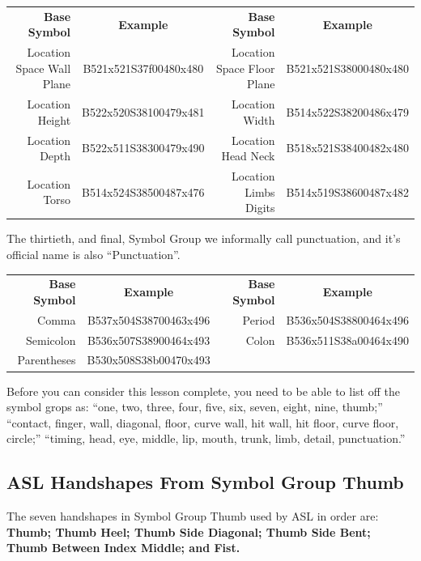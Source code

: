 \documentclass{article}
\begin{document}
\begin{center}
\begin{tabular}{rcrc}
\textbf{Base Symbol}&\textbf{Example}&\textbf{Base Symbol}&\textbf{Example}\\
Location Space Wall Plane&B521x521S37f00480x480&Location Space Floor Plane&B521x521S38000480x480\\
Location Height          &B522x520S38100479x481&Location Width            &B514x522S38200486x479\\
Location Depth           &B522x511S38300479x490&Location Head Neck        &B518x521S38400482x480\\
Location Torso           &B514x524S38500487x476&Location Limbs Digits     &B514x519S38600487x482\\
\end{tabular}
\end{center}

The thirtieth, and final, Symbol Group we informally call punctuation, and it's official name is also ``Punctuation''.

\begin{center}
\begin{tabular}{rcrc}
\textbf{Base Symbol}&\textbf{Example}&\textbf{Base Symbol}&\textbf{Example}\\
Comma      &B537x504S38700463x496&Period&B536x504S38800464x496\\
Semicolon  &B536x507S38900464x493&Colon &B536x511S38a00464x490\\
Parentheses&B530x508S38b00470x493\\
\end{tabular}
\end{center}

Before you can consider this lesson complete, you need to be able to list off the symbol grops as:
``one, two, three, four, five, six, seven, eight, nine, thumb;''
``contact, finger, wall, diagonal, floor, curve wall, hit wall, hit floor, curve floor, circle;''
``timing, head, eye, middle, lip, mouth, trunk, limb, detail, punctuation.''

\subsection{ASL Handshapes From Symbol Group Thumb}

The seven handshapes in Symbol Group Thumb used by ASL in order are:
{\bf
Thumb;
Thumb Heel;
Thumb Side Diagonal;
Thumb Side Bent;
Thumb Between Index Middle;
and Fist.
}
\end{document}
